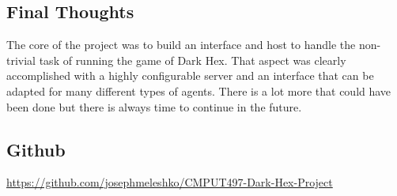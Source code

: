 \documentclass[11pt]{article}
\begin{document}
\subsection*{Final Thoughts}

The core of the project was to build an interface and host to handle the non-trivial task of running the game of Dark Hex.
That aspect was clearly accomplished with a highly configurable server and an interface that can be adapted for many different types of agents.
There is a lot more that could have been done but there is always time to continue in the future.

\subsection*{Github}
\href{https://github.com/josephmeleshko/CMPUT497-Dark-Hex-Project}{https://github.com/josephmeleshko/CMPUT497-Dark-Hex-Project}
\end{document}
